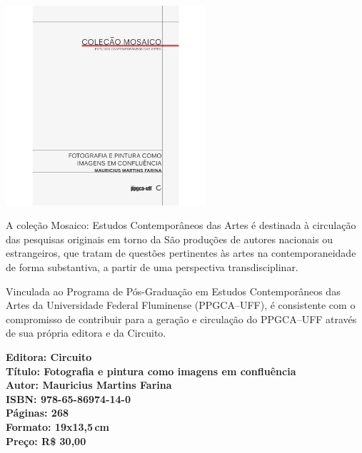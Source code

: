 \begin{center}
\hspace*{-3.6cm}
\hspace*{3.1cm}\includegraphics[width=74mm]{./CAPAS/CIRCUITO_FOTOGRAFIA.jpg}
\end{center}
\hspace*{-7cm}\hrulefill\hspace*{-7cm}
\medskip

\noindent{}A coleção Mosaico: Estudos Contemporâneos das Artes é destinada à circulação das pesquisas originais em torno da  São produções de autores nacionais ou estrangeiros, que tratam de questões pertinentes às artes na contemporaneidade de forma substantiva, a partir de uma perspectiva transdisciplinar. 

Vinculada ao Programa de Pós-Graduação em Estudos Contemporâneos das Artes da Universidade Federal Fluminense (PPGCA--UFF), é consistente com o compromisso de contribuir para a geração e circulação do PPGCA--UFF através de sua própria editora e da Circuito.

\vfill
\noindent\begin{minipage}[c]{1\linewidth}
{\small\textbf{
\hspace*{-.1cm}Editora: Circuito\\
Título: Fotografia e pintura como imagens em confluência\\
Autor: Mauricius Martins Farina\\ 
ISBN: 978-65-86974-14-0\\
Páginas: 268\\
Formato: 19x13,5\,cm\\
Preço: R\$ 30,00\\
}}
\end{minipage}
\pagebreak

